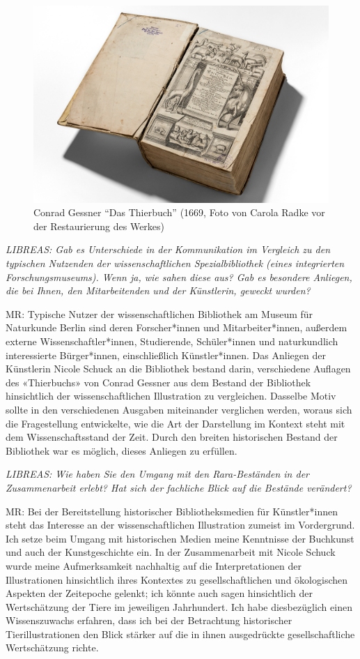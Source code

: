 \documentclass[a4paper,
fontsize=11pt,
oneside,
numbers=noperiodatend,
parskip=half-,
bibliography=totoc,
final
]{scrartcl}
\begin{document}
\begin{figure}
\centering
\includegraphics{img/image2.jpg}
\caption{Conrad Gessner \enquote{Das Thierbuch} (1669, Foto von Carola
Radke vor der Restaurierung des Werkes)}
\end{figure}

\emph{LIBREAS: Gab es Unterschiede in der Kommunikation im Vergleich zu
den typischen Nutzenden der wissenschaftlichen Spezialbibliothek (eines
integrierten Forschungsmuseums). Wenn ja, wie sahen diese aus? Gab es
besondere Anliegen, die bei Ihnen, den Mitarbeitenden und der
Künstlerin, geweckt wurden?}

MR: Typische Nutzer der wissenschaftlichen Bibliothek am Museum für
Naturkunde Berlin sind deren Forscher*innen und Mitarbeiter*innen,
außerdem externe Wissenschaftler*innen, Studierende, Schüler*innen und
naturkundlich interessierte Bürger*innen, einschließlich Künstler*innen.
Das Anliegen der Künstlerin Nicole Schuck an die Bibliothek bestand
darin, verschiedene Auflagen des «Thierbuchs» von Conrad Gessner aus dem
Bestand der Bibliothek hinsichtlich der wissenschaftlichen Illustration
zu vergleichen. Dasselbe Motiv sollte in den verschiedenen Ausgaben
miteinander verglichen werden, woraus sich die Fragestellung
entwickelte, wie die Art der Darstellung im Kontext steht mit dem
Wissenschaftsstand der Zeit. Durch den breiten historischen Bestand der
Bibliothek war es möglich, dieses Anliegen zu erfüllen.

\emph{LIBREAS: Wie haben Sie den Umgang mit den Rara-Beständen in der
Zusammenarbeit erlebt? Hat sich der fachliche Blick auf die Bestände
verändert?}

MR: Bei der Bereitstellung historischer Bibliotheksmedien für
Künstler*innen steht das Interesse an der wissenschaftlichen
Illustration zumeist im Vordergrund. Ich setze beim Umgang mit
historischen Medien meine Kenntnisse der Buchkunst und auch der
Kunstgeschichte ein. In der Zusammenarbeit mit Nicole Schuck wurde meine
Aufmerksamkeit nachhaltig auf die Interpretationen der Illustrationen
hinsichtlich ihres Kontextes zu gesellschaftlichen und ökologischen
Aspekten der Zeitepoche gelenkt; ich könnte auch sagen hinsichtlich der
Wertschätzung der Tiere im jeweiligen Jahrhundert. Ich habe
diesbezüglich einen Wissenszuwachs erfahren, dass ich bei der
Betrachtung historischer Tierillustrationen den Blick stärker auf die in
ihnen ausgedrückte gesellschaftliche Wertschätzung richte.
\end{document}
